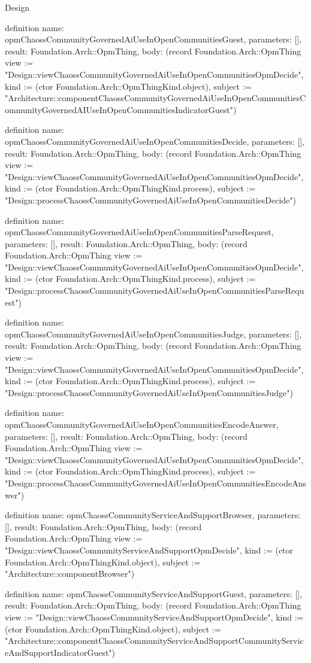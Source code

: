 \begin{lexlean}{Design}
\begin{semanticmodule}
definition{
  name: opmChaossCommunityGovernedAiUseInOpenCommunitiesGuest,
  parameters: [],
  result: Foundation.Arch::OpmThing,
  body: (record Foundation.Arch::OpmThing {view := "Design::viewChaossCommunityGovernedAiUseInOpenCommunitiesOpmDecide", kind := (ctor Foundation.Arch::OpmThingKind.object), subject := "Architecture::componentChaossCommunityGovernedAiUseInOpenCommunitiesCommunityGovernedAIUseInOpenCommunitiesIndicatorGuest"})
}

definition{
  name: opmChaossCommunityGovernedAiUseInOpenCommunitiesDecide,
  parameters: [],
  result: Foundation.Arch::OpmThing,
  body: (record Foundation.Arch::OpmThing {view := "Design::viewChaossCommunityGovernedAiUseInOpenCommunitiesOpmDecide", kind := (ctor Foundation.Arch::OpmThingKind.process), subject := "Design::processChaossCommunityGovernedAiUseInOpenCommunitiesDecide"})
}

definition{
  name: opmChaossCommunityGovernedAiUseInOpenCommunitiesParseRequest,
  parameters: [],
  result: Foundation.Arch::OpmThing,
  body: (record Foundation.Arch::OpmThing {view := "Design::viewChaossCommunityGovernedAiUseInOpenCommunitiesOpmDecide", kind := (ctor Foundation.Arch::OpmThingKind.process), subject := "Design::processChaossCommunityGovernedAiUseInOpenCommunitiesParseRequest"})
}

definition{
  name: opmChaossCommunityGovernedAiUseInOpenCommunitiesJudge,
  parameters: [],
  result: Foundation.Arch::OpmThing,
  body: (record Foundation.Arch::OpmThing {view := "Design::viewChaossCommunityGovernedAiUseInOpenCommunitiesOpmDecide", kind := (ctor Foundation.Arch::OpmThingKind.process), subject := "Design::processChaossCommunityGovernedAiUseInOpenCommunitiesJudge"})
}

definition{
  name: opmChaossCommunityGovernedAiUseInOpenCommunitiesEncodeAnswer,
  parameters: [],
  result: Foundation.Arch::OpmThing,
  body: (record Foundation.Arch::OpmThing {view := "Design::viewChaossCommunityGovernedAiUseInOpenCommunitiesOpmDecide", kind := (ctor Foundation.Arch::OpmThingKind.process), subject := "Design::processChaossCommunityGovernedAiUseInOpenCommunitiesEncodeAnswer"})
}

definition{
  name: opmChaossCommunityServiceAndSupportBrowser,
  parameters: [],
  result: Foundation.Arch::OpmThing,
  body: (record Foundation.Arch::OpmThing {view := "Design::viewChaossCommunityServiceAndSupportOpmDecide", kind := (ctor Foundation.Arch::OpmThingKind.object), subject := "Architecture::componentBrowser"})
}

definition{
  name: opmChaossCommunityServiceAndSupportGuest,
  parameters: [],
  result: Foundation.Arch::OpmThing,
  body: (record Foundation.Arch::OpmThing {view := "Design::viewChaossCommunityServiceAndSupportOpmDecide", kind := (ctor Foundation.Arch::OpmThingKind.object), subject := "Architecture::componentChaossCommunityServiceAndSupportCommunityServiceAndSupportIndicatorGuest"})
}


\end{semanticmodule}
\end{lexlean}
